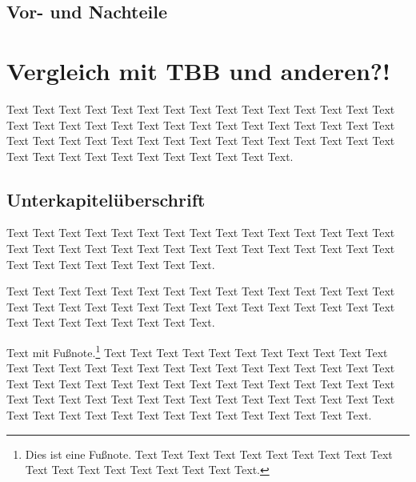 \documentclass{lni}
\begin{document}
\subsection{Vor- und Nachteile}

\section{Vergleich mit TBB und anderen?!}

Text Text Text Text Text Text Text Text Text Text Text Text Text Text Text Text Text Text Text Text Text Text Text Text Text Text Text Text Text Text Text Text Text Text Text Text Text Text Text Text Text Text Text Text Text Text Text Text Text Text Text Text Text Text Text Text.

\subsection{Unterkapitelüberschrift}

Text Text Text Text Text Text Text Text Text Text Text Text Text Text Text Text Text Text Text Text Text Text Text Text Text Text Text Text Text Text Text Text Text Text Text Text Text Text.


Text Text Text Text Text Text Text Text Text Text Text Text Text Text Text Text Text Text Text Text Text Text Text Text Text Text Text Text Text Text Text Text Text Text Text Text Text Text.

Text mit Fußnote.\footnote{Dies ist eine Fußnote. Text Text Text Text Text Text Text Text Text Text Text Text Text Text Text Text Text Text Text.} Text \cite{Ez99,ABC01} Text Text Text Text Text Text Text Text Text Text Text Text Text Text Text Text Text Text Text Text Text Text Text Text Text Text Text Text  Text Text Text Text Text Text Text Text Text Text Text Text Text Text Text Text Text Text Text Text Text Text Text Text Text Text Text Text Text Text Text Text Text Text Text Text Text Text Text Text Text.

\pagebreak

{}


\newpage
\end{document}

